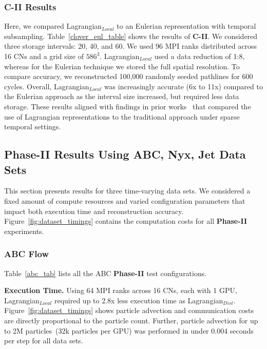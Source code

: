
\subsubsection{C-II Results} 
Here, we compared Lagrangian$_{Local}$ to an Eulerian representation with temporal subsampling.
%
Table~\ref{clover_eul_table} shows the results of \textbf{C-II}.
%
We considered three storage intervals: 20, 40, and 60.
%
We used 96 MPI ranks distributed across 16 CNs and a grid size of $586^3$.
%
Lagrangian$_{Local}$ used a data reduction of 1:8, whereas for the Eulerian technique we stored the full spatial resolution.
%
To compare accuracy, we reconstructed 100,000 randomly seeded pathlines for 600 cycles.
%
%
Overall, Lagrangian$_{Local}$ was increasingly accurate (6x to 11x) compared to the Eulerian approach as the interval size increased, but required less data storage.
%
These results aligned with findings in prior works~\cite{agranovsky2014improved, sane2018revisiting} that compared the use of Lagrangian representations to the traditional approach under sparse temporal settings.

\subsection{Phase-II Results Using ABC, Nyx, Jet Data Sets}
This section presents results for three time-varying data sets.
%
We considered a fixed amount of compute resources and varied configuration parameters that impact both execution time and reconstruction accuracy.
%
Figure~\ref{fig:dataset_timings} contains the computation costs for all \textbf{Phase-II} experiments.

\label{sec:experiment2}
\subsubsection{ABC Flow}
\label{sec:abc}

Table~\ref{abc_tab} lists all the ABC \textbf{Phase-II} test configurations.
%




\textbf{Execution Time.} Using 64 MPI ranks across 16 CNs, each with 1 GPU, Lagrangian$_{Local}$ required up to 2.8x less execution time as Lagrangian$_{Dist}$.
%
Figure~\ref{fig:dataset_timings} shows particle advection and communication costs are directly proportional to the particle count.
%
Further, particle advection for up to 2M particles~(32k particles per GPU) was performed in under 0.004 seconds per step for all data sets.
%


